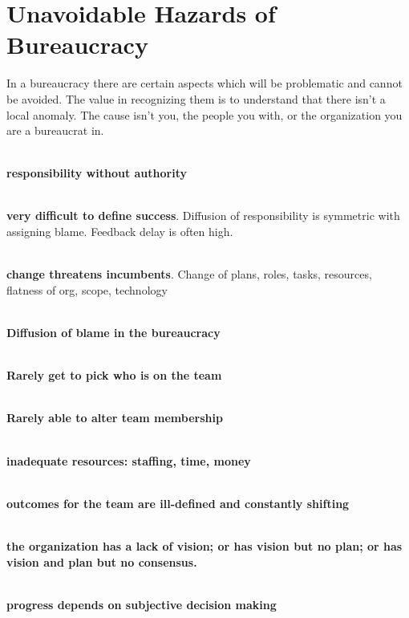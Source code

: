 \section{Unavoidable Hazards of Bureaucracy\label{sec:unavoidable_hazards}}

In a bureaucracy there are certain aspects which will be problematic and cannot be avoided. The value in recognizing them is to understand that there isn't a local anomaly. The cause isn't you, the people you with, or the organization you are a bureaucrat in. 

\ \\

\textbf{responsibility without authority}

\ \\

\textbf{very difficult to define success}. Diffusion of responsibility is symmetric with assigning blame. Feedback delay is often high.

\ \\

\textbf{change threatens incumbents}. Change of plans, roles, tasks, resources, flatness of org, scope, technology 

\ \\

\textbf{Diffusion of blame in the bureaucracy}

\ \\

\textbf{Rarely get to pick who is on the team}

\ \\

\textbf{Rarely able to alter team membership}

\ \\

\textbf{inadequate resources: staffing, time, money}

\ \\

\textbf{outcomes for the team are ill-defined and constantly shifting}

\ \\

\textbf{the organization has a lack of vision; or has vision but no plan; or has vision and plan but no consensus.}

\ \\

\textbf{progress depends on subjective decision making}

\ \\


